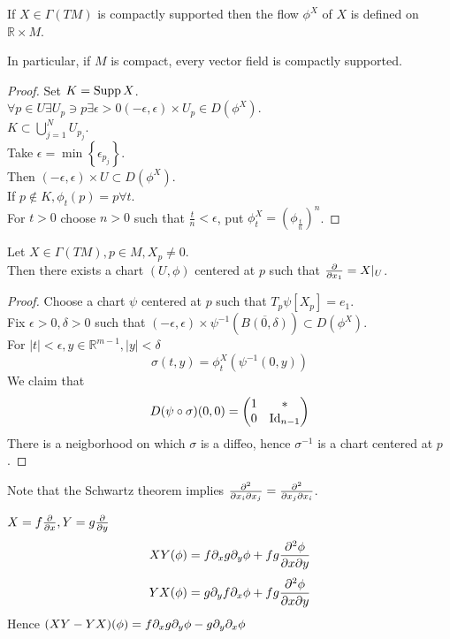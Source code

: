 \documentclass[../main.tex]{subfiles}
\begin{document}
\begin{propo}
If $X\in \Gamma( TM) $ is compactly supported then the flow $\phi^{X}$ of $X$ is defined on $ \mathbb{R}\times M$.
\end{propo}
In particular, if $M$ is compact, every vector field is compactly supported.
\begin{proof}
Set $K=\operatorname{Supp} X$.\\
$\forall p \in U \exists U_p \ni p \exists \epsilon>0 ( -\epsilon,\epsilon) \times U_p \in D( \phi^{X}) $.\\
$K \subset \bigcup_{j=1}^{N}U_{p_j} $.\\
Take $\epsilon = \min \left\{ \epsilon_{p_j}  \right\} $.\\
Then $( -\epsilon,\epsilon) \times U \subset D( \phi^{X}) $.\\
If $p \notin K, \phi_t( p) =p\forall t$.\\
For $t>0 $ choose $n>0$ such that $\frac{t}{n}< \epsilon$, put $\phi_t^{X}= ( \phi_{\frac{t}{n}} )^{n}$.
\end{proof}
\begin{propo}
Let $X\in \Gamma( TM) ,p \in M, X_p \neq 0$.\\
Then there exists a chart $( U,\phi) $ centered at $p$ such that $\frac{\partial}{\partial x_1}= X|_U$.
\end{propo}
\begin{proof}
Choose a chart $\psi$ centered at $p$ such that $T_p\psi [ X_p] = e_1$.\\
Fix $\epsilon>0, \delta>0$ such that $( -\epsilon,\epsilon) \times \psi^{-1}(  \overline{B( 0,\delta) }) \subset D( \phi^{X}) $.\\
For $|t|<\epsilon, y \in \mathbb{R}^{m-1},|y|< \delta$ 
\[ 
\sigma( t,y) = \phi_t^{X}( \psi^{-1}( 0,y) ) 
\]
We claim that
\[ 
D( \psi\circ \sigma) ( 0,0) =
\begin{pmatrix}
	1 & \ast\\
	0 & \operatorname{Id}_{n-1} 
\end{pmatrix} 
\]
There is a neigborhood on which $\sigma$ is a diffeo, hence $\sigma^{-1}$ is a chart centered at $p$ .
\end{proof}
Note that the Schwartz theorem implies $ \frac{\partial^{2}}{\partial x_i\partial x_j}= \frac{\partial ^{2}}{\partial x_j \partial x_i}$.
\begin{exemple}
$X= f \frac{\partial}{\partial x}, Y = g \frac{\partial}{\partial y}$ 
\[ 
XY ( \phi) = f \partial_x g \partial_y \phi + fg \frac{\partial^{2}\phi}{\partial x\partial y}
\]
\[ 
YX( \phi) = g \partial_y f \partial_x \phi + fg \frac{\partial ^{2}\phi}{\partial x\partial y}
\]
Hence $( XY-YX) ( \phi) = f \partial_x g \partial_y \phi - g \partial_y \partial_x\phi$ 
\end{exemple}
\end{document}
